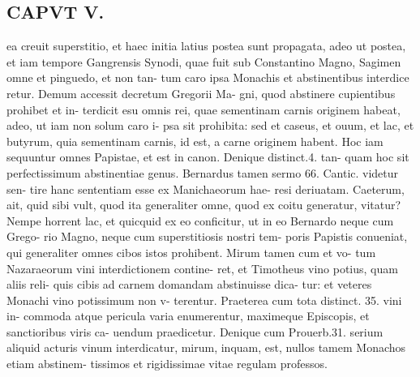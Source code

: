 \documentclass{article}
\begin{document}
\begin{pages}
\section*{CAPVT  V. }
\marginpar{[ p.879 ]}ea creuit superstitio, et haec initia latius postea sunt propagata, adeo ut postea, et iam tempore Gangrensis Synodi, quae fuit sub Constantino Magno, Sagimen omne et pinguedo, et non tan- tum caro ipsa Monachis et abstinentibus interdice retur. Demum accessit decretum Gregorii Ma- gni, quod abstinere cupientibus prohibet et in- terdicit esu omnis rei, quae sementinam carnis originem habeat, adeo, ut iam non solum caro i- psa sit prohibita: sed et caseus, et ouum, et lac, et butyrum, quia sementinam carnis, id est, a carne originem habent. Hoc iam sequuntur omnes Papistae, et est in canon. Denique distinct.4. tan- quam hoc sit perfectissimum abstinentiae genus. Bernardus tamen sermo 66. Cantic. videtur sen- tire hanc sententiam esse ex Manichaeorum hae- resi deriuatam. Caeterum, ait, quid sibi vult, quod ita generaliter omne, quod ex coitu generatur, vitatur? Nempe horrent lac, et quicquid ex eo conficitur, ut in eo Bernardo neque cum Grego- rio Magno, neque cum superstitiosis nostri tem- poris Papistis conueniat, qui generaliter omnes cibos istos prohibent. Mirum tamen cum et vo- tum Nazaraeorum vini interdictionem contine- ret, et Timotheus vino potius, quam aliis reli- quis cibis ad carnem domandam abstinuisse dica- tur: et veteres Monachi vino potissimum non v- terentur. Praeterea cum tota distinct. 35. vini in- commoda atque pericula varia enumerentur, maximeque Episcopis, et sanctioribus viris ca- uendum praedicetur. Denique cum Prouerb.31. serium aliquid acturis vinum interdicatur, mirum, inquam, est, nullos tamem Monachos etiam abstinem- tissimos et rigidissimae vitae regulam professos. 

\end{pages}
\end{document}
